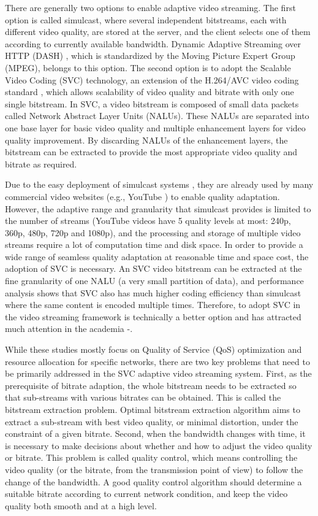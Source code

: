 \documentclass[journal]{IEEEtran}
\begin{document}
There are generally two options to enable adaptive video streaming. The first option is called simulcast, where several independent bitstreams, each with different video quality, are stored at the server, and the client selects one of them according to currently available bandwidth. Dynamic Adaptive Streaming over HTTP (DASH) \cite{DASH}, which is standardized by the Moving Picture Expert Group (MPEG), belongs to this option. The second option is to adopt the Scalable Video Coding (SVC) \cite{SVC} technology, an extension of the H.264/AVC video coding standard \cite{SVCOverview}, which allows scalability of video quality and bitrate with only one single bitstream. In SVC, a video bitstream is composed of small data packets called Network Abstract Layer Units (NALUs). These NALUs are separated into one base layer for basic video quality and multiple enhancement layers for video quality improvement. By discarding NALUs of the enhancement layers, the bitstream can be extracted to provide the most appropriate video quality and bitrate as required.

Due to the easy deployment of simulcast systems \cite{Bouten14}, they are already used by many commercial video websites (e.g., YouTube \cite{YouTube}) to enable quality adaptation. However, the adaptive range and granularity that simulcast provides is limited to the number of streams (YouTube videos have 5 quality levels at most: 240p, 360p, 480p, 720p and 1080p), and the processing and storage of multiple video streams require a lot of computation time and disk space. In order to provide a wide range of seamless quality adaptation at reasonable time and space cost, the adoption of SVC is necessary. An SVC video bitstream can be extracted at the fine granularity of one NALU (a very small partition of data), and performance analysis \cite{SVCPerformance} shows that SVC also has much higher coding efficiency than simulcast where the same content is encoded multiple times. Therefore, to adopt SVC in the video streaming framework is technically a better option and has attracted much attention in the academia \cite{Chuah12}-\cite{Cicalo14}.

While these studies mostly focus on Quality of Service (QoS) optimization and resource allocation for specific networks, there are two key problems that need to be primarily addressed in the SVC adaptive video streaming system. First, as the prerequisite of bitrate adaption, the whole bitstream needs to be extracted so that sub-streams with various bitrates can be obtained. This is called the bitstream extraction problem. Optimal bitstream extraction algorithm aims to extract a sub-stream with best video quality, or minimal distortion, under the constraint of a given bitrate. Second, when the bandwidth changes with time, it is necessary to make decisions about whether and how to adjust the video quality or bitrate. This problem is called quality control, which means controlling the video quality (or the bitrate, from the transmission point of view) to follow the change of the bandwidth. A good quality control algorithm should determine a suitable bitrate according to current network condition, and keep the video quality both smooth and at a high level.
\end{document}
